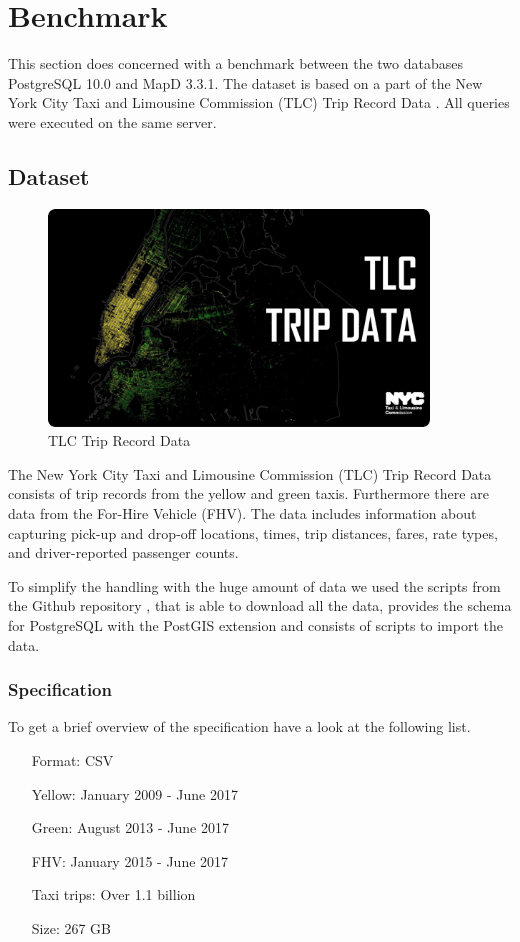 \chapter{Benchmark}
This section does concerned with a benchmark between the two databases PostgreSQL 10.0 and MapD 3.3.1.
The dataset is based on a part of the New York City Taxi and Limousine Commission (TLC) Trip Record Data \cite{nyc}.
All queries were executed on the same server.

\section{Dataset}
\label{sec:dataset}
\begin{figure}[H]
\centering
\captionsetup{justification=centering}
\includegraphics[width=0.9\textwidth]{images/nyc_taxi.png}
\caption[Taxi Dropoffs]{TLC Trip Record Data}
\end{figure}

The New York City Taxi and Limousine Commission (TLC) Trip Record Data \cite{nyc} consists of trip records from the yellow and green taxis.
Furthermore there are data from the For-Hire Vehicle (FHV).
The data includes information about capturing pick-up and drop-off locations, times, trip distances, fares, rate types, and driver-reported passenger counts.

To simplify the handling with the huge amount of data we used the scripts from the Github repository \cite{nyctaxigithub}, that is able to download all the data,
provides the schema for PostgreSQL with the PostGIS \cite{postgis} extension and consists of scripts to import the data.

\subsection{Specification}
To get a brief overview of the specification have a look at the following list.
\begin{itemize}[noitemsep, topsep=0pt]
\itemsep-0.5em
 \item[Format:]  CSV
 \item[Yellow:]  January 2009 - June 2017
 \item[Green:]  August 2013 - June 2017
 \item[FHV:]  January 2015 - June 2017
 \item[Taxi trips:] Over 1.1 billion \cite{billion}
 \item[Size:] 267 GB \cite{billion}
\end{itemize}

